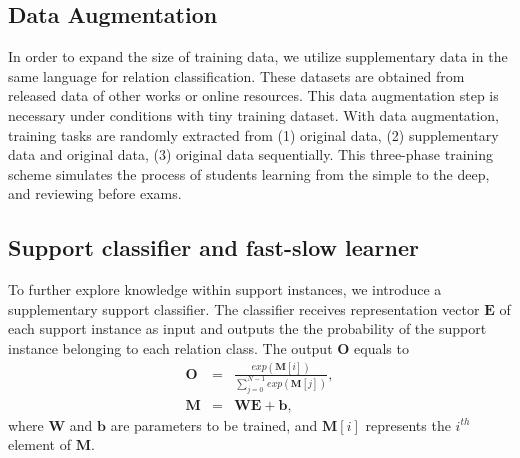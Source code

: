 \subsection{Data Augmentation}
\label{sec:data}
In order to expand the size of training data, we utilize supplementary data in the same language for relation classification. These datasets are obtained from released data of other works or online resources. This data augmentation step is necessary under conditions with tiny training dataset.
With data augmentation, training tasks are randomly extracted from (1) original data, (2) supplementary data and original data, (3) original data sequentially.
This three-phase training scheme simulates the process of students learning from the simple to the deep, and reviewing before exams.

\subsection{Support classifier and fast-slow learner}
\label{sec:cls}
To further explore knowledge within support instances, we introduce a supplementary support classifier. The classifier receives representation vector $\mathbf{E}$ of each support instance as input and outputs the the probability of the support instance belonging to each relation class. %
The output $\mathbf{O}$ equals to
\begin{eqnarray}
\mathbf{O} &=& \frac{exp(\mathbf{M}[i])}{\sum_{j=0}^{N-1} exp(\mathbf{M}[j])}, \\
\mathbf{M} &=& \mathbf{WE}+ \mathbf{b},
\end{eqnarray}
where $\mathbf{W}$ and $\mathbf{b}$ are parameters to be trained, and $\mathbf{M}[i]$ represents the $i^{th}$ element of $\mathbf{M}$.

